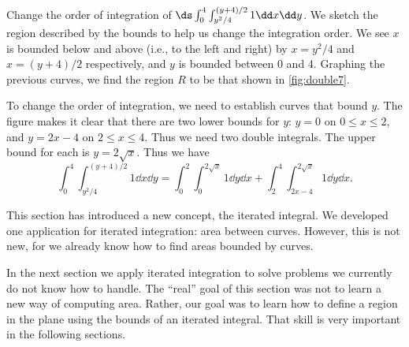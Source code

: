 \begin{example}\label{ex_double7}%
Change the order of integration of $\ds\int_0^4\int_{y^2/4}^{(y+4)/2}1\dd x\dd y$.
\solution
We sketch the region described by the bounds to help us change the integration order. We see $x$ is bounded below and above (i.e., to the left and right) by $x=y^2/4$ and $x=(y+4)/2$ respectively, and $y$ is bounded between 0 and 4. Graphing the previous curves, we find the region $R$ to be that shown in \autoref{fig:double7}.


To change the order of integration, we need to establish curves that bound $y$. The figure makes it clear that there are two lower bounds for $y$: $y=0$ on $0\leq x\leq 2$, and $y=2x-4$ on $2\leq x\leq 4$. Thus we need two double integrals. The upper bound for each is $y=2\sqrt{x}$. Thus we have
\[
\int_0^4\int_{y^2/4}^{(y+4)/2}1\dd x\dd y
= \int_0^2\int_0^{2\sqrt{x}} 1\dd y\dd x + \int_2^4\int_{2x-4}^{2\sqrt{x}}1\dd y\dd x.
\]
\end{example}

This section has introduced a new concept, the iterated integral. We developed one application for iterated integration: area between curves. However, this is not new, for we already know how to find areas bounded by curves.

In the next section we apply iterated integration to solve problems we currently do not know how to handle. The ``real'' goal of this section was not to learn a new way of computing area. Rather, our goal was to learn how to define a region in the plane using the bounds of an iterated integral. That skill is very important in the following sections.

